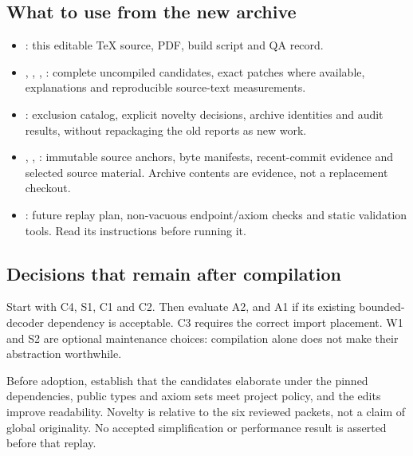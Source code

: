 \subsection{What to use from the new archive}

\begin{itemize}
\item {}: this editable TeX source, PDF, build script and QA record.
\item {}, , ,
: complete uncompiled candidates, exact patches where
available, explanations and reproducible source-text measurements.
\item {}: exclusion catalog, explicit novelty decisions,
archive identities and audit results, without repackaging the old reports as new work.
\item {}, , :
immutable source anchors, byte manifests, recent-commit evidence and selected
source material. Archive contents are evidence, not a replacement checkout.
\item {}: future replay plan, non-vacuous endpoint/axiom
checks and static validation tools. Read its instructions before running it.
\end{itemize}

\subsection{Decisions that remain after compilation}

Start with C4, S1, C1 and C2. Then evaluate A2, and A1 if its existing
bounded-decoder dependency is acceptable. C3 requires the correct import
placement. W1 and S2 are optional maintenance choices: compilation alone
does not make their abstraction worthwhile.

Before adoption, establish that the candidates elaborate under the pinned
dependencies, public types and axiom sets meet project policy, and the edits
improve readability. Novelty is relative to the six reviewed packets, not a
claim of global originality. No accepted simplification or performance result
is asserted before that replay.
